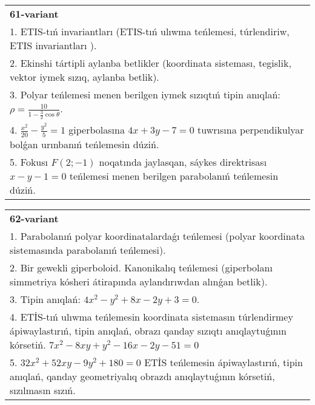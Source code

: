 \documentclass{article}
\begin{document}
\begin{tabular}{m{17cm}}
\textbf{61-variant}\\
1. ETIS-tıń invariantları (ETIS-tıń ulıwma teńlemesi, túrlendiriw, ETIS invariantları ).\\

2. Ekinshi tártipli aylanba betlikler (koordinata sisteması, tegislik, vektor iymek sızıq, aylanba betlik).\\

3. Polyar teńlemesi menen berilgen iymek sızıqtıń tipin anıqlań: $\rho=\frac{10}{1-\frac{3}{2}\cos\theta}$.\\

4. $\frac{x^{2}}{20} - \frac{y^{2}}{5} = 1$ giperbolasına $4x + 3y - 7 = 0$ tuwrısına perpendikulyar bolǵan urınbanıń teńlemesin dúziń.  \\

5. Fokusı $F(2; - 1)$ noqatında jaylasqan, sáykes direktrisası $x - y - 1 = 0$ teńlemesi menen berilgen parabolanıń teńlemesin dúziń.  
\end{tabular}
\vspace{1cm}


\begin{tabular}{m{17cm}}
\textbf{62-variant}\\
1. Parabolanıń polyar koordinatalardaǵı teńlemesi (polyar koordinata sistemasında parabolanıń teńlemesi).\\

2. Bir gewekli giperboloid. Kanonikalıq teńlemesi (giperbolanı simmetriya kósheri átirapında aylandırıwdan alınǵan betlik).\\

3. Tipin anıqlań: $4 x^{2}-y^{2}+8 x-2 y+3=0$.\\

4. ETİS-tıń ulıwma teńlemesin koordinata sistemasın túrlendirmey ápiwaylastırıń, tipin anıqlań, obrazı qanday sızıqtı anıqlaytuǵının kórsetiń. $7x^{2} - 8xy + y^{2} - 16x - 2y - 51 = 0$  \\

5. $32x^{2} + 52xy - 9y^{2} + 180 = 0$ ETİS teńlemesin ápiwaylastırıń, tipin anıqlań, qanday geometriyalıq obrazdı anıqlaytuǵının kórsetiń, sızılmasın sızıń.  
\end{tabular}
\vspace{1cm}
\end{document}
